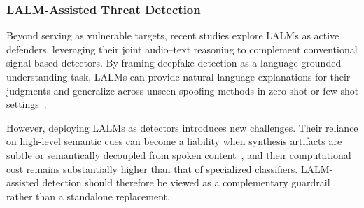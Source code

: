 

\subsubsection{LALM-Assisted Threat Detection}

Beyond serving as vulnerable targets, recent studies explore LALMs as active defenders, leveraging their joint audio--text reasoning to complement conventional signal-based detectors. By framing deepfake detection as a language-grounded understanding task, LALMs can provide natural-language explanations for their judgments and generalize across unseen spoofing methods in zero-shot or few-shot settings~\cite{li2025dfallm,xie2026interpretable}.

However, deploying LALMs as detectors introduces new challenges. Their reliance on high-level semantic cues can become a liability when synthesis artifacts are subtle or semantically decoupled from spoken content~\cite{nguyen2026analyzing}, and their computational cost remains substantially higher than that of specialized classifiers. LALM-assisted detection should therefore be viewed as a complementary guardrail rather than a standalone replacement.

